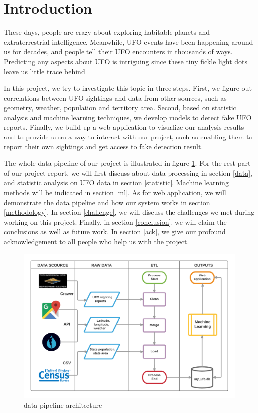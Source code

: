 \section{Introduction}

These days, people are crazy about exploring habitable planets and extraterrestrial intelligence. Meanwhile, UFO events have been happening around us for decades, and people tell their UFO encounters in thousands of ways. Predicting any aspects about UFO is intriguing since these tiny fickle light dots leave us little trace behind.

In this project, we try to investigate this topic in three steps. First, we figure out correlations between UFO sightings and data from other sources, such as geometry, weather, population and territory area. Second, based on statistic analysis and machine learning techniques, we develop models to detect fake UFO reports. Finally, we build up a web application to visualize our analysis results and to provide users a way to interact with our project, such as enabling them to report their own sightings and get access to fake detection result.

The whole data pipeline of our project is illustrated in figure \ref{architecture}. For the rest part of our project report,  we will first discuss about data processing in section \ref{data}, and statistic analysis on UFO data in section \ref{statistic}. Machine learning methods will be indicated in section \ref{ml}. As for web application,  we will demonstrate the data pipeline and how our system works in section \ref{methodology}. In section \ref{challenge}, we will discuss the challenges we met during working on this project. Finally, in section \ref{conclusion}, we will claim the conclusions as well as future work. In section \ref{ack}, we give our profound acknowledgement to all people who help us with the project.

\begin{figure}[H]
    \centering
    \includegraphics[width=14cm]{figure/architecture.png}
    \caption{data pipeline architecture}
    \label{architecture}
\end{figure}